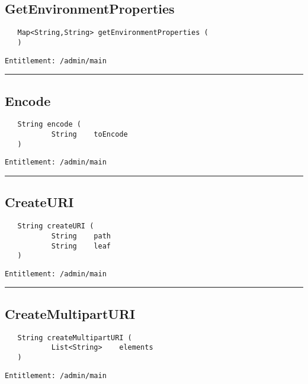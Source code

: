 \subsection{GetEnvironmentProperties}
\label{Api:GetEnvironmentProperties}
\begin{Verbatim}
   Map<String,String> getEnvironmentProperties (
   )
\end{Verbatim}
\begin{Verbatim}[formatcom=\color{Maroon}]
  Entitlement: /admin/main
\end{Verbatim}



\rule{12cm}{2pt}
\subsection{Encode}
\label{Api:Encode}
\begin{Verbatim}
   String encode (
           String    toEncode
   )
\end{Verbatim}
\begin{Verbatim}[formatcom=\color{Maroon}]
  Entitlement: /admin/main
\end{Verbatim}



\rule{12cm}{2pt}
\subsection{CreateURI}
\label{Api:CreateURI}
\begin{Verbatim}
   String createURI (
           String    path
           String    leaf
   )
\end{Verbatim}
\begin{Verbatim}[formatcom=\color{Maroon}]
  Entitlement: /admin/main
\end{Verbatim}



\rule{12cm}{2pt}
\subsection{CreateMultipartURI}
\label{Api:CreateMultipartURI}
\begin{Verbatim}
   String createMultipartURI (
           List<String>    elements
   )
\end{Verbatim}
\begin{Verbatim}[formatcom=\color{Maroon}]
  Entitlement: /admin/main
\end{Verbatim}




